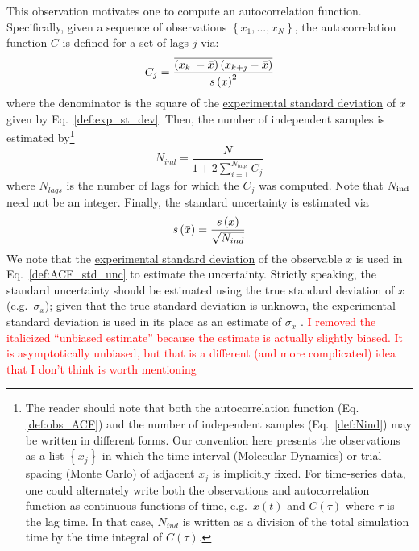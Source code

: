 This observation motivates one to compute an autocorrelation function.  Specifically, given a sequence of observations $\left\{x_1, ..., x_N\right\}$, the autocorrelation function $C$ is defined for a set of lags $j$ via:
%
\begin{equation}
  C_j = \dfrac{
   \overline{
      \left( x_{k{\color{white}j}}\hspace{-1pt} - \mean{x} \right)
      \left( x_{k+j} - \mean{x} \right)
    }
  }
  {\stdev{x}^2}
  \label{def:obs_ACF}
\end{equation}
%
where the denominator is the square of the \hyperref[def:exp_st_dev]{experimental standard deviation} of $x$ given by Eq.~\ref{def:exp_st_dev}.
Then, the number of independent samples is estimated by\footnote{The reader should note that both the autocorrelation function (Eq. \ref{def:obs_ACF}) and the number of independent samples (Eq.~\ref{def:Nind}) may be written in different forms\cite{Grossfield2009,Chodera-2016}. Our convention here presents the observations as a list $\left\{x_j\right\}$ in which the time interval (Molecular Dynamics) or trial spacing (Monte Carlo) of adjacent $x_j$ is implicitly fixed. For time-series data, one could alternately write both the observations and autocorrelation function as continuous functions of time, e.g.~$x\left(t\right)$ and $C\left(\tau\right)$ where $\tau$ is the lag time. In that case, $N_{ind}$ is written as a division of the total simulation time by the time integral of $C\left(\tau\right)$\cite{Grossfield2009}.}
%
\begin{equation}
  N_{ind} = \dfrac{N}{1+2 \sum_{i=1}^{N_{lags}} C_j}
  \label{def:Nind}
\end{equation}
%
where $N_{lags}$ is the number of lags for which the $C_j$ was computed.  Note that $N_{\rm ind}$ need not be an integer.
Finally, the standard uncertainty is estimated via
%
\begin{equation}
  s\left( \bar{x} \right) = \dfrac{s\left( x \right)}{\sqrt{N_{ind}}}
  \label{def:ACF_std_unc}
\end{equation}
%
We note that the \hyperref[def:exp_st_dev]{experimental standard deviation} of the observable $x$ is used in Eq.~\ref{def:ACF_std_unc} to estimate the uncertainty. Strictly speaking, the standard uncertainty should be estimated using the true standard deviation of $x$ (e.g.\ $\sigma_x$); given that the true standard deviation is unknown, the experimental standard deviation is used in its place as an estimate of $\sigma_x$ \cite{PatroneAIAA}.
\textcolor{red}{I removed the italicized ``unbiased estimate'' because the estimate is actually slightly biased.  It is asymptotically unbiased, but that is a different (and more complicated) idea that I don't think is worth mentioning}

